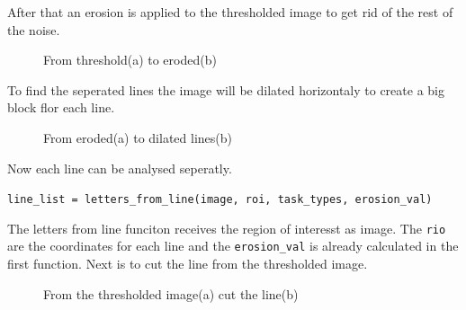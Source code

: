 After that an erosion is applied to the thresholded image to get rid of the rest of the noise.

\begin{figure}[H]
    \centering
    \qquad
    \caption{From threshold(a) to eroded(b)}
\end{figure}

To find the seperated lines the image will be dilated horizontaly to create a big block flor each line.

\begin{figure}[H]
    \centering
    \qquad
    \caption{From eroded(a) to dilated lines(b)}
\end{figure}

Now each line can be analysed seperatly.

\texttt{line\_list = letters\_from\_line(image, roi, task\_types, erosion\_val)}

The letters from line funciton receives the region of interesst as image. The \texttt{rio} are the coordinates for each line and the \texttt{erosion\_val} is already calculated in the first function.
Next is to cut the line from the thresholded image.

\begin{figure}[H]
    \centering
    \qquad
    \caption{From the thresholded image(a) cut the line(b)}
\end{figure}

